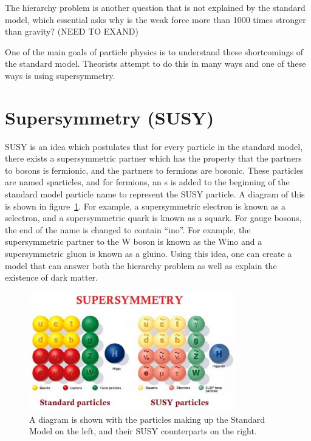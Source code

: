 The hierarchy problem is another question that is not explained by the standard model,
which essential asks why is the weak force more than 1000 times stronger than gravity?
(NEED TO EXAND)


One of the main goals of particle physics is to understand these shortcomings of the standard model.
Theorists attempt to do this in many ways and one of these ways is using supersymmetry.

\section{Supersymmetry (SUSY)}
SUSY is an idea which postulates that for every particle in the standard model,
there exists a supersymmetric partner which has the property that the partners to bosons is fermionic, and the partners to fermions are bosonic.
These particles are named sparticles, and for fermions, an s is added to the beginning of the standard model particle name to represent the SUSY particle.
A diagram of this is shown in figure~\ref{fig:SM_SUSY}.
For example, a supersymmetric electron is known as a selectron, and a supersymmetric quark is known as a squark.
For gauge bosons, the end of the name is changed to contain ``ino''.
For example, the supersymmetric partner to the W boson is known as the Wino and a supersymmetric gluon is known as a gluino.
Using this idea, one can create a model that can answer both the hierarchy problem as well as explain the existence of dark matter.

\begin{figure}[!htb]
  \begin{center}
    \includegraphics[width=0.8\textwidth]{intro/figs/Susy-particles.pdf}
    \caption{
      \label{fig:SM_SUSY}
      A diagram is shown with the particles making up the Standard Model on the left, and their SUSY counterparts on the right.
    }
  \end{center}
\end{figure}

